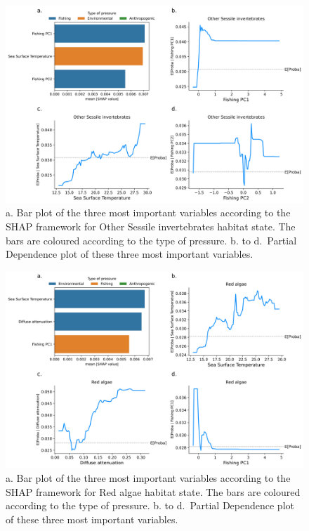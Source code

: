 \begin{figure}
\hypertarget{fig:chap3figS45}{%
\centering
\includegraphics{03-Chapitre3/figures/supplementary/04-pdp_Other Sessile invertebrates.png}
\caption{a. Bar plot of the three most important variables according to
the SHAP framework for Other Sessile invertebrates habitat state. The
bars are coloured according to the type of pressure. b. to d.~Partial
Dependence plot of these three most important
variables.}\label{fig:chap3figS45}
}
\end{figure}

\begin{figure}
\hypertarget{fig:chap3figS46}{%
\centering
\includegraphics{03-Chapitre3/figures/supplementary/04-pdp_Red algae.png}
\caption{a. Bar plot of the three most important variables according to
the SHAP framework for Red algae habitat state. The bars are coloured
according to the type of pressure. b. to d.~Partial Dependence plot of
these three most important variables.}\label{fig:chap3figS46}
}
\end{figure}


